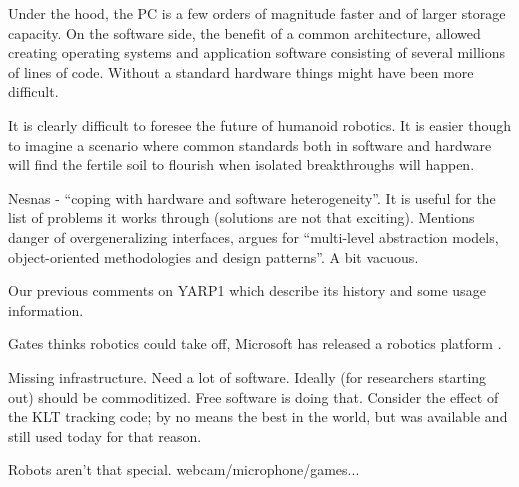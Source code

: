 Under the hood, the PC is a few orders of magnitude faster and of larger
storage capacity. On the software side, the benefit of a common architecture, 
allowed creating operating systems and application software consisting of 
several millions of lines of code. Without a standard hardware things
might have been more difficult.

It is clearly difficult to foresee the future of humanoid robotics. It is
easier though to imagine a scenario where common standards both in software and
hardware will find the fertile soil to flourish when isolated breakthroughs 
will happen.




Nesnas \cite{nesnas2006claraty} - ``coping with hardware and software 
heterogeneity''.  It is useful for the list of problems it
works through (solutions are not that exciting).
%
Mentions danger of overgeneralizing interfaces, argues for 
``multi-level abstraction models, object-oriented methodologies
and design patterns''.  A bit vacuous.



Our previous comments on YARP1 \cite{metta2006yarp} which
describe its history and some usage information.

Gates thinks robotics could take off, Microsoft has
released a robotics platform \cite{gates2007robot}.

Missing infrastructure.
Need a lot of software.
Ideally (for researchers starting out) should be commoditized.
Free software is doing that.
%
Consider the effect of the KLT tracking code; by no means
the best in the world, but was available and still used
today for that reason.



Robots aren't that special.  webcam/microphone/games...

